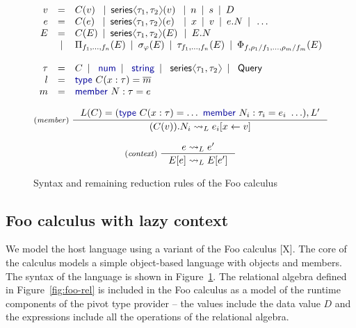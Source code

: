 \documentclass[a4paper,UKenglish]{lipics-v2016}
\theoremstyle{plain}
\theoremstyle{definition}
\newcommand{\langl}{\begin{picture}(4.5,7)
\put(1.1,2.5){\rotatebox{60}{\line(1,0){5.5}}}
\put(1.1,2.5){\rotatebox{300}{\line(1,0){5.5}}}
\end{picture}}
\newcommand{\rangl}{\begin{picture}(4.5,7)
\put(.9,2.5){\rotatebox{120}{\line(1,0){5.5}}}
\put(.9,2.5){\rotatebox{240}{\line(1,0){5.5}}}
\end{picture}}
\newcommand{\lsep}{~\,|\,~}
\newcommand{\kvd}[1]{\textnormal{\textcolor{kvdclr}{\sffamily #1}}}
\newcommand{\ident}[1]{\textnormal{\sffamily #1}}
\begin{document}
\begin{figure}
\vspace{-1em}
\begin{equation*}
\begin{array}{rcl}
  v &=& C(v)\,\, \lsep \ident{series}\langl \tau_1, \tau_2 \rangl(v)\; \lsep n \lsep s \lsep D \\
  e &=& C(e)\,\, \lsep \ident{series}\langl \tau_1, \tau_2 \rangl(e)\;\, \lsep x \lsep v \lsep e.N \lsep \ldots\\
  E &=& C(E) \lsep \ident{series}\langl \tau_1, \tau_2 \rangl(E)\, \lsep E.N \\
    &|& \Pi_{f_1, \ldots, f_n}(E) \lsep \sigma_\varphi(E) \lsep \tau_{f_1, \ldots, f_n}(E) \lsep \Phi_{f, \rho_1/f_1, \ldots, \rho_m/f_m} (E) \\
    \\
 \tau &=& C \lsep \kvd{num} \lsep \kvd{string} \lsep \ident{series}\langl \tau_1, \tau_2 \rangl \lsep \ident{Query}\\
 l &=& \kvd{type}~C(x:\tau) = \overline{m} \\
 m &=& \kvd{member}~N:\tau= e
\end{array}
\end{equation*}
\vspace{-1.5em}

\[
\inference[(\emph{member})~]
{ L(C) = (\kvd{type}~C(x:\tau)= \ldots~\kvd{member}~N_i : \tau_i = e_i~\ldots), L'}
{ (C(v)).N_i \leadsto_L e_i[x \leftarrow v] }\\
\]
\vspace{-3em}

\[
\inference[(\emph{context})~]
{e \leadsto_L e'}
{E[e] \leadsto_L E[e']}
\]
\caption{Syntax and remaining reduction rules of the Foo calculus}
\label{fig:foo-syntax}
\end{figure}


\subsection{Foo calculus with lazy context}
\label{sec:foo-foo}

We model the host language using a variant of the Foo calculus [X]. The core of the calculus models
a simple object-based language with objects and members. The syntax of the language is shown in
Figure~\ref{fig:foo-syntax}. The relational algebra defined in Figure~\ref{fig:foo-rel} is included
in the Foo calculus as a model of the runtime components of the pivot type provider -- the values
include the data value $D$ and the expressions include all the operations of the relational algebra.
\end{document}
